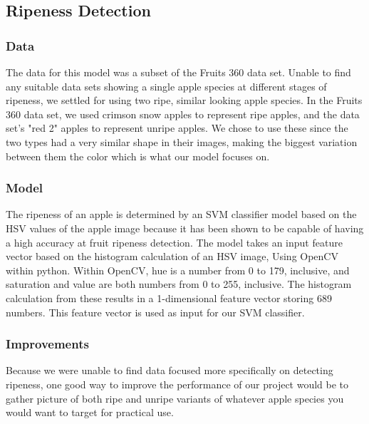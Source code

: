 \subsection{Ripeness Detection}
\subsubsection{Data}
The data for this model was a subset of the Fruits 360 data set. %
Unable to find any suitable data sets showing a single apple species at different stages of ripeness, we settled for using two ripe, similar looking apple species.
In the Fruits 360 data set, we used crimson snow apples to represent ripe apples, and the data set's "red 2" apples to represent unripe apples. We  chose to use these since the two types had a very similar shape in their images, making the biggest variation between them the color which is what our model focuses on.

\subsubsection{Model}
The ripeness of an apple is determined by an SVM classifier model based on the HSV values of the apple image because it has been shown to be capable of having a high accuracy at fruit ripeness detection\cite{HSVRipeness}.
The model takes an input feature vector based on the histogram calculation of an HSV image, Using OpenCV within python.
Within OpenCV, hue is a number from 0 to 179, inclusive, and saturation and value are both numbers from 0 to 255, inclusive.
The histogram calculation from these results in a 1-dimensional feature vector storing 689 numbers. 
This feature vector is used as input for our SVM classifier.

\subsubsection{Improvements}
Because we were unable to find data focused more specifically on detecting ripeness, one good way to improve the performance of our project would be to gather picture of both ripe and unripe variants of whatever apple species you would want to target for practical use. 



